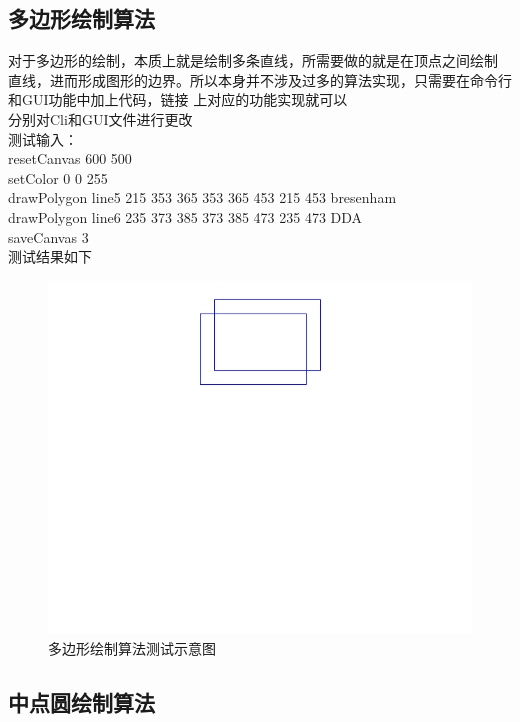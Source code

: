 \documentclass[a4paper,UTF8]{article}
\theoremstyle{definition}
\begin{document}
\subsection{多边形绘制算法}
对于多边形的绘制，本质上就是绘制多条直线，所需要做的就是在顶点之间绘制
直线，进而形成图形的边界。所以本身并不涉及过多的算法实现，只需要在命令行和GUI功能中加上代码，链接
上对应的功能实现就可以\\
分别对Cli和GUI文件进行更改\\

测试输入：\\
\indent resetCanvas 600 500\\
\indent setColor 0 0 255\\
\indent drawPolygon line5 215 353 365 353 365 453 215 453 bresenham\\
\indent drawPolygon line6 235 373 385 373 385 473 235 473 DDA\\
\indent saveCanvas 3\\

测试结果如下\\
\begin{figure}[h]
	\centering
	\includegraphics[scale=0.6]{figure/polytest.png}
	\caption{多边形绘制算法测试示意图}
	\label{fig:Poly}
\end{figure}


\subsection{中点圆绘制算法}
\end{document}
